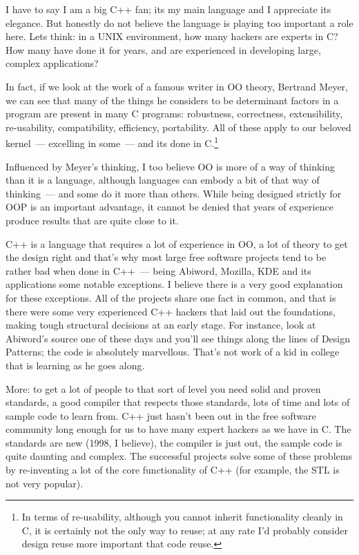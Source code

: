 \documentclass{book}
\begin{document}
I have to say I am a big C++ fan; its my main language and I
appreciate its elegance. But honestly do not believe the language is
playing too important a role here. Lets think: in a UNIX environment,
how many hackers are experts in C? How many have done it for years,
and are experienced in developing large, complex applications?

In fact, if we look at the work of a famous writer in OO theory,
Bertrand Meyer, we can see that many of the things he considers to be
determinant factors in a program are present in many C programs:
robustness, correctness, extensibility, re-usability, compatibility,
efficiency, portability. All of these apply to our beloved kernel~---
excelling in some~--- and its done in C.\footnote{In terms of
  re-usability, although you cannot inherit functionality cleanly in
  C, it is certainly not the only way to reuse; at any rate I'd
  probably consider design reuse more important that code reuse.}

Influenced by Meyer's thinking, I too believe OO is more of a way of
thinking than it is a language, although languages can embody a bit of
that way of thinking~--- and some do it more than others. While being
designed strictly for OOP is an important advantage, it cannot be
denied that years of experience produce results that are quite close
to it.

C++ is a language that requires a lot of experience in OO, a lot of
theory to get the design right and that's why most large free software
projects tend to be rather bad when done in C++~--- being Abiword,
Mozilla, KDE and its applications some notable exceptions. I believe
there is a very good explanation for these exceptions. All of the
projects share one fact in common, and that is there were some very
experienced C++ hackers that laid out the foundations, making tough
structural decisions at an early stage. For instance, look at
Abiword's source one of these days and you'll see things along the
lines of Design Patterns; the code is absolutely marvellous. That's
not work of a kid in college that is learning as he goes along.

More: to get a lot of people to that sort of level you need solid and
proven standards, a good compiler that respects those standards, lots
of time and lots of sample code to learn from. C++ just hasn't been
out in the free software community long enough for us to have many
expert hackers as we have in C. The standards are new (1998, I
believe), the compiler is just out, the sample code is quite daunting
and complex. The successful projects solve some of these problems by
re-inventing a lot of the core functionality of C++ (for example, the
STL is not very popular).
\end{document}
